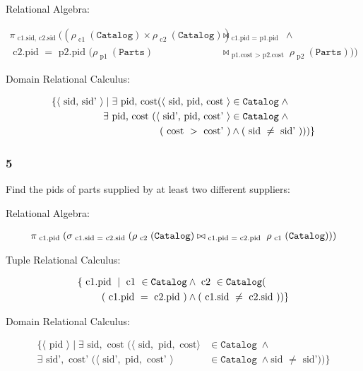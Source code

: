 Relational Algebra:

\begin{align*}
  \pi_{\text{ c1.sid, c2.sid }}((\rho_{\text{ c1 }}(\mathtt{Catalog}) \times \rho_{\text{ c2 }}(\mathtt{Catalog})) &\bowtie_{\text{ c1.pid } = \text{ p1.pid }} \wedge \\ 
  \text{ c2.pid } = \text{ p2.pid }(\rho_{\text{ p1 }}(\mathtt{Parts}) &\bowtie_{\text{ p1.cost } > \text{ p2.cost }} \rho_{\text{ p2 }}(\mathtt{Parts})))
\end{align*}



Domain Relational Calculus:

\begin{align*}
  \{\langle \text{ sid, sid' } \rangle 
    \mid \exists \text{ pid, cost} (\langle \text{ sid, pid, cost } \rangle 
      &\in \mathtt{Catalog} \; \wedge \\
    \exists \text{ pid, cost } (\langle \text{ sid', pid, cost' } \rangle
      &\in \mathtt{Catalog} \; \wedge \\
  (\text{ cost } > \text{ cost' }) &\wedge (\text{ sid } \neq \text{ sid' })))\}
\end{align*}



\subsubsection{5}

Find the pids of parts supplied by at least two different suppliers:

Relational Algebra:

\begin{align*}
  \pi_{\text{ c1.pid }}(\sigma_{\text{ c1.sid }=\text{ c2.sid }}(\rho_{\text{ c2 }}(\mathtt{Catalog}) \bowtie_{\text{ c1.pid } = \text{ c2.pid }} \rho_{\text{ c1 }}(\mathtt{Catalog})))
\end{align*}

Tuple Relational Calculus:

\begin{align*}
  \{ \text{ c1.pid } \mid \text{ c1 } \in \mathtt{Catalog} &\wedge \text{ c2 } \in \mathtt{Catalog} (\\
(\text{ c1.pid } = \text{ c2.pid }) &\wedge (\text{ c1.sid } \neq \text{ c2.sid })) \}
\end{align*}

Domain Relational Calculus:

\begin{align*}
  \{\langle \text{ pid } \rangle 
    \mid \exists \text{ sid}, \text{ cost } 
    (\langle \text{ sid}, \text{ pid}, \text{ cost} \rangle 
      &\in \mathtt{Catalog} \; \wedge \\
       \exists \text{ sid'}, \text{ cost' } (
        \langle \text{ sid'}, \text{ pid}, \text{ cost' } \rangle 
    &\in \mathtt{Catalog} \; \wedge \text{sid } \neq \text{ sid'}))\}
\end{align*}


